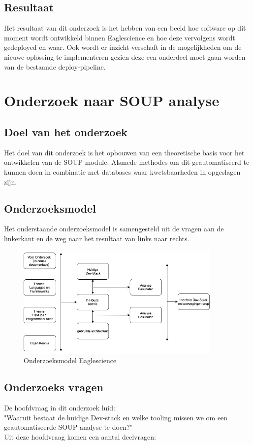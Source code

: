 \subsection{Resultaat}
Het resultaat van dit onderzoek is het hebben van een beeld hoe software op dit moment wordt ontwikkeld binnen Eaglescience en hoe deze vervolgens wordt gedeployed en waar. Ook wordt er inzicht verschaft in de mogelijkheden om de nieuwe oplossing te implementeren gezien deze een onderdeel moet gaan worden van de bestaande deploy-pipeline.
\section{Onderzoek naar SOUP analyse}
\subsection{Doel van het onderzoek}
Het doel van dit onderzoek is het opbouwen van een theoretische basis voor het ontwikkelen van de SOUP module. Alsmede methodes om dit geautomatiseerd te kunnen doen in combinatie met databases waar kwetsbaarheden in opgeslagen zijn.


\subsection{Onderzoeksmodel}
Het onderstaande onderzoeksmodel is samengesteld uit de vragen aan de linkerkant en de weg naar het resultaat van links naar rechts.\\
\begin{figure}[h!]
\myfloatalign
\includegraphics[width=10cm]{gfx/OnderzoeksmodelES}
\caption{Onderzoeksmodel Eaglescience}
\label{fig:Onderzoeks model Dev-Stack}
\end{figure}

\subsection{Onderzoeks vragen}
De hoofdvraag in dit onderzoek luid: \\
"Waaruit bestaat de huidige Dev-stack en welke tooling missen we om een geautomatiseerde SOUP analyse te doen?"\\
Uit deze hoofdvraag komen een aantal deelvragen:

